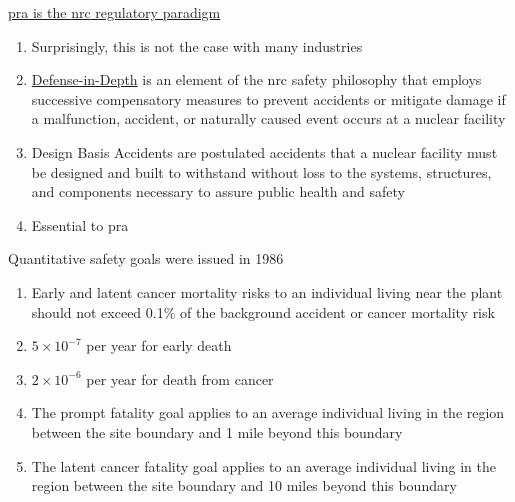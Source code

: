 \documentclass[aspectratio=1610,pdftex,dvipsnames,compress,xcolor={dvipsnames}]{beamer}
\newcommand{\acs}{\acrshort} %
\begin{document}
\addtocounter{framenumber}{-1}
\begin{frame}{\href{https://ocw.mit.edu/courses/22-38-probability-and-its-applications-to-reliability-quality-control-and-risk-assessment-fall-2005/resources/sec12_pra_aposta/}{\acs{pra} is the \acs{nrc} regulatory paradigm}}
    \begin{enumerate}[series=outerlist,topsep=0pt,itemsep=21pt,leftmargin=*,label=(\arabic*)]
        \item[]Surprisingly, this is not the case with many industries
        \item[]\href{https://www.nrc.gov/reading-rm/doc-collections/commission/srm/1998/1998-144srm.pdf}{Defense-in-Depth} is an element of the \acs{nrc} safety philosophy that employs successive compensatory measures to prevent accidents or mitigate damage if a malfunction, accident, or naturally caused event occurs at a nuclear facility
        \item[]Design Basis Accidents are postulated accidents that a nuclear facility must be designed and built to withstand without loss to the systems, structures, and components necessary to assure public health and safety
        \item[]Essential to \acs{pra}
    \end{enumerate}
\end{frame}


\begin{frame}{Quantitative safety goals were issued in 1986}
    \begin{enumerate}[series=outerlist,topsep=0pt,itemsep=21pt,leftmargin=*,label=(\arabic*)]
        \item[]Early and latent cancer mortality risks to an individual living near the plant should not exceed 0.1\% of the background accident or cancer mortality risk
        \item[]$5 \times 10^{-7}$ per year for early death
        \item[]$2 \times 10^{-6}$ per year for death from cancer
        \item[]The prompt fatality goal applies to an average individual living in the region between the site boundary and 1 mile beyond this boundary
        \item[]The latent cancer fatality goal applies to an average individual living in the region between the site boundary and 10 miles beyond this boundary
    \end{enumerate}
\end{frame}
\end{document}
